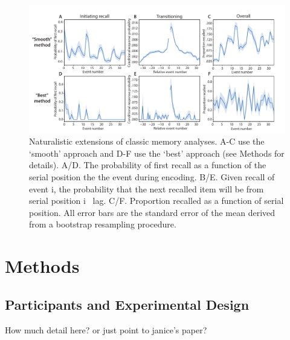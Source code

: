\documentclass[a4paper,man,natbib,floatsintext]{apa6}
\newcommand{\rpm}{\raisebox{.2ex}{$\scriptstyle\pm$}}
\begin{document}
\begin{figure}[t!]
\centering
\includegraphics[width=1\textwidth]{figs/3_behav_eventseg.pdf}
\caption{\label{fig:behav}Naturalistic extensions of classic memory analyses. A-C use the `smooth' approach and D-F use the `best' approach (see Methods for details). A/D. The probability of first recall as a function of the serial position the the event during encoding. B/E. Given recall of event i, the probability that the next recalled item will be from serial position i \rpm~lag. C/F. Proportion recalled as a function of serial position. All error bars are the standard error of the mean derived from a bootstrap resampling procedure.
}
\end{figure}


\section{Methods}
\label{sec:methods}

\subsection{Participants and Experimental Design}
How much detail here? or just point to janice's paper?
\end{document}
